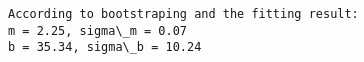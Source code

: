 \documentclass{article}
\newlength{\cellleftmargin}
\newlength{\smallerfontscale}
\def\smaller{\fontsize{\smallerfontscale}{\smallerfontscale}\selectfont}
\begin{document}
\par\vspace{1\smallerfontscale}%
    \begin{addmargin}[\cellleftmargin]{0em}%
    {\smaller%
    \vspace{-1\smallerfontscale}%
    
    \begin{Verbatim}[commandchars=\\\{\}]
According to bootstraping and the fitting result:
m = 2.25, sigma\_m = 0.07
b = 35.34, sigma\_b = 10.24
    \end{Verbatim}
}%
    \end{addmargin}%
    \begin{addmargin}[\cellleftmargin]{0em}%
    {\smaller%
    \vspace{-1\smallerfontscale}%
    
    \begin{center}
    \end{center}
    { \hspace*{\fill} \\}
    }%
    \end{addmargin}%
    \begin{addmargin}[\cellleftmargin]{0em}%
    {\smaller%
    \vspace{-1\smallerfontscale}%
    
    \begin{center}
    \end{center}
    { \hspace*{\fill} \\}
    }%
    \end{addmargin}%
\end{document}
